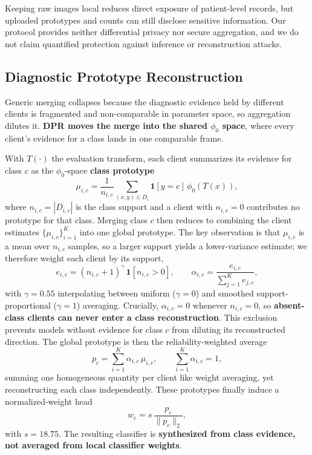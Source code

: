 \documentclass[journal,twoside,web]{ieeecolor}
\begin{document}
Keeping raw images local reduces direct exposure of patient-level records, but uploaded prototypes and counts can still disclose sensitive information. Our protocol provides neither differential privacy nor secure aggregation, and we do not claim quantified protection against inference or reconstruction attacks.


\subsection{Diagnostic Prototype Reconstruction}

Generic merging collapses because the diagnostic evidence held by different clients is fragmented and non-comparable in parameter space, so aggregation dilutes it. \textbf{DPR moves the merge into the shared $\phi_0$ space}, where every client's evidence for a class lands in one comparable frame.

With $T(\cdot)$ the evaluation transform, each client summarizes its evidence for class $c$ as the $\phi_0$-space \textbf{class prototype}
\begin{equation}
\mu_{i,c}=\frac{1}{n_{i,c}}\sum_{(x,y)\in D_i}\mathbf{1}[y=c]\,\phi_0(T(x)),
\end{equation}
where $n_{i,c}=|D_{i,c}|$ is the class support and a client with $n_{i,c}=0$ contributes no prototype for that class. Merging class $c$ then reduces to combining the client estimates $\{\mu_{i,c}\}_{i=1}^{K}$ into one global prototype. The key observation is that $\mu_{i,c}$ is a mean over $n_{i,c}$ samples, so a larger support yields a lower-variance estimate; we therefore weight each client by its support,
\begin{equation}
e_{i,c}=(n_{i,c}+1)^{\gamma}\,\mathbf{1}[n_{i,c}>0],\qquad
\alpha_{i,c}=\frac{e_{i,c}}{\sum_{j=1}^{K} e_{j,c}},
\label{eq:support-weight}
\end{equation}
with $\gamma=0.55$ interpolating between uniform ($\gamma=0$) and smoothed support-proportional ($\gamma=1$) averaging. Crucially, $\alpha_{i,c}=0$ whenever $n_{i,c}=0$, so \textbf{absent-class clients can never enter a class reconstruction}. This exclusion prevents models without evidence for class $c$ from diluting its reconstructed direction. The global prototype is then the reliability-weighted average
\begin{equation}
p_c=\sum_{i=1}^{K}\alpha_{i,c}\,\mu_{i,c},\qquad \sum_{i=1}^{K}\alpha_{i,c}=1,
\label{eq:dpr-fuse}
\end{equation}
summing one homogeneous quantity per client like weight averaging, yet reconstructing each class independently. These prototypes finally induce a normalized-weight head
\begin{equation}
w_c=s\,\frac{p_c}{\|p_c\|_2},
\end{equation}
with $s=18.75$. The resulting classifier is \textbf{synthesized from class evidence, not averaged from local classifier weights}.
\end{document}
